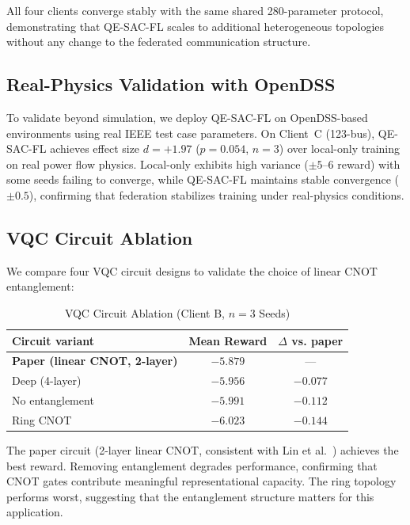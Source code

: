 \documentclass[journal]{IEEEtran}
\begin{document}
All four clients converge stably with the same shared 280-parameter protocol,
demonstrating that QE-SAC-FL scales to additional heterogeneous topologies
without any change to the federated communication structure.

\subsection{Real-Physics Validation with OpenDSS}

To validate beyond simulation, we deploy QE-SAC-FL on OpenDSS-based
environments using real IEEE test case parameters.
On Client~C (123-bus), QE-SAC-FL achieves effect size $d=+1.97$
($p=0.054$, $n=3$) over local-only training on real power flow physics.
Local-only exhibits high variance ($\pm 5$--6 reward) with some seeds
failing to converge, while QE-SAC-FL maintains stable convergence ($\pm 0.5$),
confirming that federation stabilizes training under real-physics conditions.

\subsection{VQC Circuit Ablation}

We compare four VQC circuit designs to validate the choice of
linear CNOT entanglement:

\begin{table}[t]
\centering
\caption{VQC Circuit Ablation (Client B, $n=3$ Seeds)}
\label{tab:vqc}
\begin{tabular}{lcc}
\toprule
Circuit variant & Mean Reward & $\Delta$ vs. paper \\
\midrule
\textbf{Paper (linear CNOT, 2-layer)} & $\mathbf{-5.879}$ & --- \\
Deep (4-layer)        & $-5.956$ & $-0.077$ \\
No entanglement       & $-5.991$ & $-0.112$ \\
Ring CNOT             & $-6.023$ & $-0.144$ \\
\bottomrule
\end{tabular}
\end{table}

The paper circuit (2-layer linear CNOT, consistent with Lin et al.\
\cite{lin2025qesac}) achieves the best reward.
Removing entanglement degrades performance, confirming that CNOT gates
contribute meaningful representational capacity.
The ring topology performs worst, suggesting that the entanglement
structure matters for this application.
\end{document}

